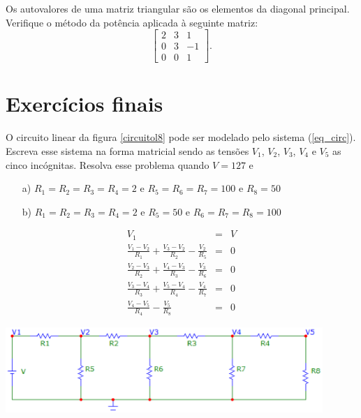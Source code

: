 \begin{Exercise}Os autovalores de uma matriz triangular são os elementos da diagonal principal. Verifique o método da potência aplicada à seguinte matriz:
$$
\left[\begin{array}{ccc}
2&3&1\\
0&3&-1\\
0&0&1
\end{array}\right].
$$
\end{Exercise}

\section*{Exercícios finais}

\begin{Exercise}[title=Eletricidade]\label{circuito1}
\Question O circuito linear da figura \ref{circuitol8} pode ser modelado pelo sistema (\ref{eq_circ}). Escreva esse sistema na forma matricial sendo as tensões $V_1$, $V_2$, $V_3$, $V_4$ e $V_5$ as cinco incógnitas. Resolva esse problema quando $V=127$ e
\begin{itemize}
\item[a)] $R_1=R_2=R_3=R_4=2$ e $R_5=R_6=R_7=100$ e $R_8=50$
\item[b)] $R_1=R_2=R_3=R_4=2$ e $R_5=50$ e $R_6=R_7=R_8=100$
\end{itemize}

\begin{subequations}\label{eq_circ}
\begin{eqnarray}
V_1&=&V\\
\frac{V_1-V_2}{R_1}+\frac{V_3-V_2}{R_2}-\frac{V_2}{R_5}&=&0\\
\frac{V_2-V_3}{R_2}+\frac{V_4-V_3}{R_3}-\frac{V_3}{R_6}&=&0\\
\frac{V_3-V_4}{R_3}+\frac{V_5-V_4}{R_4}-\frac{V_4}{R_7}&=&0\\
\frac{V_4-V_5}{R_4}-\frac{V_5}{R_8}&=&0
\end{eqnarray}
\end{subequations}

\begin{center}
\includegraphics[width=12cm,angle=0]{./cap_linsis/pics/circuito_linear_8.eps}\label{circuitol8}
\end{center}


\end{Exercise}
